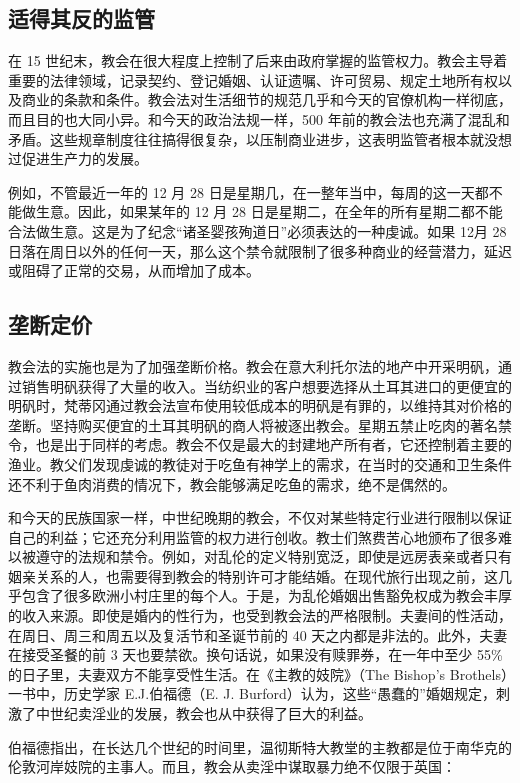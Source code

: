 \subsection{适得其反的监管}
在 15 世纪末，教会在很大程度上控制了后来由政府掌握的监管权力。教会主导着重要的法律领域，记录契约、登记婚姻、认证遗嘱、许可贸易、规定土地所有权以及商业的条款和条件。教会法对生活细节的规范几乎和今天的官僚机构一样彻底，而且目的也大同小异。和今天的政治法规一样，500 年前的教会法也充满了混乱和矛盾。这些规章制度往往搞得很复杂，以压制商业进步，这表明监管者根本就没想过促进生产力的发展。

例如，不管最近一年的 12 月 28 日是星期几，在一整年当中，每周的这一天都不能做生意。因此，如果某年的 12 月 28 日是星期二，在全年的所有星期二都不能合法做生意。这是为了纪念“诸圣婴孩殉道日”必须表达的一种虔诚。如果 12月 28 日落在周日以外的任何一天，那么这个禁令就限制了很多种商业的经营潜力，延迟或阻碍了正常的交易，从而增加了成本。

\subsection{垄断定价}
教会法的实施也是为了加强垄断价格。教会在意大利托尔法的地产中开采明矾，通过销售明矾获得了大量的收入。当纺织业的客户想要选择从土耳其进口的更便宜的明矾时，梵蒂冈通过教会法宣布使用较低成本的明矾是有罪的，以维持其对价格的垄断。坚持购买便宜的土耳其明矾的商人将被逐出教会。星期五禁止吃肉的著名禁令，也是出于同样的考虑。教会不仅是最大的封建地产所有者，它还控制着主要的渔业。教父们发现虔诚的教徒对于吃鱼有神学上的需求，在当时的交通和卫生条件还不利于鱼肉消费的情况下，教会能够满足吃鱼的需求，绝不是偶然的。

和今天的民族国家一样，中世纪晚期的教会，不仅对某些特定行业进行限制以保证自己的利益；它还充分利用监管的权力进行创收。教士们煞费苦心地颁布了很多难以被遵守的法规和禁令。例如，对乱伦的定义特别宽泛，即使是远房表亲或者只有姻亲关系的人，也需要得到教会的特别许可才能结婚。在现代旅行出现之前，这几乎包含了很多欧洲小村庄里的每个人。于是，为乱伦婚姻出售豁免权成为教会丰厚的收入来源。即使是婚内的性行为，也受到教会法的严格限制。夫妻间的性活动，在周日、周三和周五以及复活节和圣诞节前的 40 天之内都是非法的。此外，夫妻在接受圣餐的前 3 天也要禁欲。换句话说，如果没有赎罪券，在一年中至少 55\%的日子里，夫妻双方不能享受性生活。在《主教的妓院》（The Bishop's Brothels）一书中，历史学家 E.J.伯福德（E. J. Burford）认为，这些“愚蠢的”婚姻规定，刺激了中世纪卖淫业的发展，教会也从中获得了巨大的利益。

伯福德指出，在长达几个世纪的时间里，温彻斯特大教堂的主教都是位于南华克的伦敦河岸妓院的主事人。而且，教会从卖淫中谋取暴力绝不仅限于英国：

